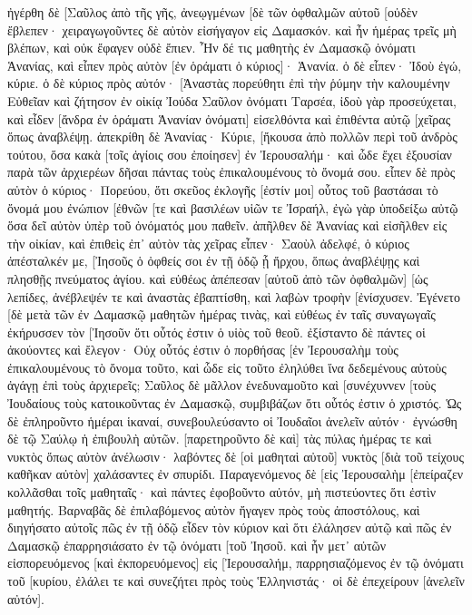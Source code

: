 ἠγέρθη δὲ [Σαῦλος ἀπὸ τῆς γῆς, ἀνεῳγμένων [δὲ τῶν ὀφθαλμῶν αὐτοῦ [οὐδὲν ἔβλεπεν· χειραγωγοῦντες δὲ αὐτὸν εἰσήγαγον εἰς Δαμασκόν. 
καὶ ἦν ἡμέρας τρεῖς μὴ βλέπων, καὶ οὐκ ἔφαγεν οὐδὲ ἔπιεν. 
Ἦν δέ τις μαθητὴς ἐν Δαμασκῷ ὀνόματι Ἁνανίας, καὶ εἶπεν πρὸς αὐτὸν [ἐν ὁράματι ὁ κύριος]· Ἁνανία. ὁ δὲ εἶπεν· Ἰδοὺ ἐγώ, κύριε. 
ὁ δὲ κύριος πρὸς αὐτόν· [Ἀναστὰς πορεύθητι ἐπὶ τὴν ῥύμην τὴν καλουμένην Εὐθεῖαν καὶ ζήτησον ἐν οἰκίᾳ Ἰούδα Σαῦλον ὀνόματι Ταρσέα, ἰδοὺ γὰρ προσεύχεται, 
καὶ εἶδεν [ἄνδρα ἐν ὁράματι Ἁνανίαν ὀνόματι] εἰσελθόντα καὶ ἐπιθέντα αὐτῷ [χεῖρας ὅπως ἀναβλέψῃ. 
ἀπεκρίθη δὲ Ἁνανίας· Κύριε, [ἤκουσα ἀπὸ πολλῶν περὶ τοῦ ἀνδρὸς τούτου, ὅσα κακὰ [τοῖς ἁγίοις σου ἐποίησεν] ἐν Ἰερουσαλήμ· 
καὶ ὧδε ἔχει ἐξουσίαν παρὰ τῶν ἀρχιερέων δῆσαι πάντας τοὺς ἐπικαλουμένους τὸ ὄνομά σου. 
εἶπεν δὲ πρὸς αὐτὸν ὁ κύριος· Πορεύου, ὅτι σκεῦος ἐκλογῆς [ἐστίν μοι] οὗτος τοῦ βαστάσαι τὸ ὄνομά μου ἐνώπιον [ἐθνῶν [τε καὶ βασιλέων υἱῶν τε Ἰσραήλ, 
ἐγὼ γὰρ ὑποδείξω αὐτῷ ὅσα δεῖ αὐτὸν ὑπὲρ τοῦ ὀνόματός μου παθεῖν. 
ἀπῆλθεν δὲ Ἁνανίας καὶ εἰσῆλθεν εἰς τὴν οἰκίαν, καὶ ἐπιθεὶς ἐπ᾽ αὐτὸν τὰς χεῖρας εἶπεν· Σαοὺλ ἀδελφέ, ὁ κύριος ἀπέσταλκέν με, [Ἰησοῦς ὁ ὀφθείς σοι ἐν τῇ ὁδῷ ᾗ ἤρχου, ὅπως ἀναβλέψῃς καὶ πλησθῇς πνεύματος ἁγίου. 
καὶ εὐθέως ἀπέπεσαν [αὐτοῦ ἀπὸ τῶν ὀφθαλμῶν] [ὡς λεπίδες, ἀνέβλεψέν τε καὶ ἀναστὰς ἐβαπτίσθη, 
καὶ λαβὼν τροφὴν [ἐνίσχυσεν. Ἐγένετο [δὲ μετὰ τῶν ἐν Δαμασκῷ μαθητῶν ἡμέρας τινὰς, 
καὶ εὐθέως ἐν ταῖς συναγωγαῖς ἐκήρυσσεν τὸν [Ἰησοῦν ὅτι οὗτός ἐστιν ὁ υἱὸς τοῦ θεοῦ. 
ἐξίσταντο δὲ πάντες οἱ ἀκούοντες καὶ ἔλεγον· Οὐχ οὗτός ἐστιν ὁ πορθήσας [ἐν Ἰερουσαλὴμ τοὺς ἐπικαλουμένους τὸ ὄνομα τοῦτο, καὶ ὧδε εἰς τοῦτο ἐληλύθει ἵνα δεδεμένους αὐτοὺς ἀγάγῃ ἐπὶ τοὺς ἀρχιερεῖς; 
Σαῦλος δὲ μᾶλλον ἐνεδυναμοῦτο καὶ [συνέχυννεν [τοὺς Ἰουδαίους τοὺς κατοικοῦντας ἐν Δαμασκῷ, συμβιβάζων ὅτι οὗτός ἐστιν ὁ χριστός. 
Ὡς δὲ ἐπληροῦντο ἡμέραι ἱκαναί, συνεβουλεύσαντο οἱ Ἰουδαῖοι ἀνελεῖν αὐτόν· 
ἐγνώσθη δὲ τῷ Σαύλῳ ἡ ἐπιβουλὴ αὐτῶν. [παρετηροῦντο δὲ καὶ] τὰς πύλας ἡμέρας τε καὶ νυκτὸς ὅπως αὐτὸν ἀνέλωσιν· 
λαβόντες δὲ [οἱ μαθηταὶ αὐτοῦ] νυκτὸς [διὰ τοῦ τείχους καθῆκαν αὐτὸν] χαλάσαντες ἐν σπυρίδι. 
Παραγενόμενος δὲ [εἰς Ἰερουσαλὴμ [ἐπείραζεν κολλᾶσθαι τοῖς μαθηταῖς· καὶ πάντες ἐφοβοῦντο αὐτόν, μὴ πιστεύοντες ὅτι ἐστὶν μαθητής. 
Βαρναβᾶς δὲ ἐπιλαβόμενος αὐτὸν ἤγαγεν πρὸς τοὺς ἀποστόλους, καὶ διηγήσατο αὐτοῖς πῶς ἐν τῇ ὁδῷ εἶδεν τὸν κύριον καὶ ὅτι ἐλάλησεν αὐτῷ καὶ πῶς ἐν Δαμασκῷ ἐπαρρησιάσατο ἐν τῷ ὀνόματι [τοῦ Ἰησοῦ. 
καὶ ἦν μετ᾽ αὐτῶν εἰσπορευόμενος [καὶ ἐκπορευόμενος] εἰς [Ἰερουσαλήμ, παρρησιαζόμενος ἐν τῷ ὀνόματι τοῦ [κυρίου, 
ἐλάλει τε καὶ συνεζήτει πρὸς τοὺς Ἑλληνιστάς· οἱ δὲ ἐπεχείρουν [ἀνελεῖν αὐτόν]. 
